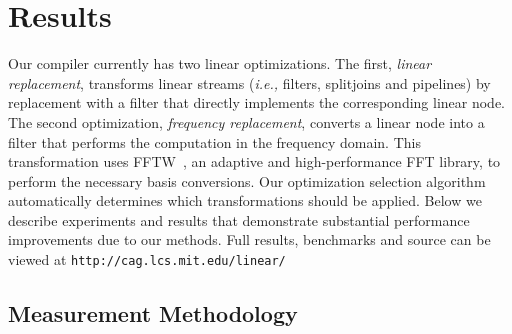 \section{Results}
\label{sec:results}

Our compiler currently has two linear optimizations. The first, {\it
linear replacement}, transforms linear streams ({\it i.e.,} filters,
splitjoins and pipelines) by replacement with a filter that directly
implements the corresponding linear node.  The second optimization,
{\it frequency replacement}, converts a linear node into a filter that
performs the computation in the frequency domain.  This transformation
uses FFTW~\cite{frigo99fast}, an adaptive and high-performance FFT
library, to perform the necessary basis conversions.  Our optimization
selection algorithm automatically determines which transformations
should be applied.  Below we describe experiments and results that
demonstrate substantial performance improvements due to our methods.
Full results, benchmarks and source can be viewed at
{\tt http://cag.lcs.mit.edu/linear/}

\subsection{Measurement Methodology}


